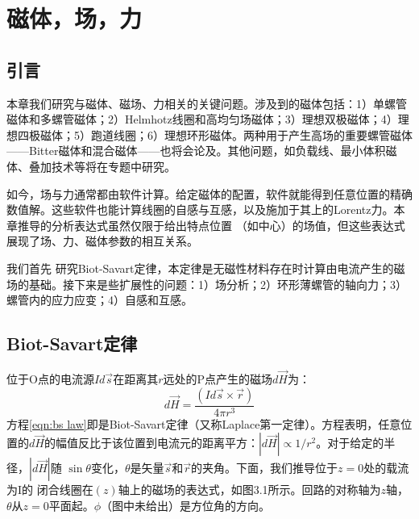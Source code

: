 \chapter{磁体，场，力}
\section{引言}
本章我们研究与磁体、磁场、力相关的关键问题。涉及到的磁体包括：1）单螺管磁体和多螺管磁体；2）Helmhotz线圈和高均匀场磁体；3）理想双极磁体；4）理想四极磁体；5）跑道线圈；6）理想环形磁体。两种用于产生高场的重要螺管磁体——Bitter磁体和混合磁体——也将会论及。其他问题，如负载线、最小体积磁体、叠加技术等将在专题中研究。

如今，场与力通常都由软件计算。给定磁体的配置，软件就能得到任意位置的精确数值解。这些软件也能计算线圈的自感与互感，以及施加于其上的Lorentz力。本章推导的分析表达式虽然仅限于给出特点位置
（如中心）的场值，但这些表达式展现了场、力、磁体参数的相互关系。

我们首先 研究Biot-Savart定律，本定律是无磁性材料存在时计算由电流产生的磁场的基础。接下来是些扩展性的问题：1）场分析；2）环形薄螺管的轴向力；3）螺管内的应力应变；4）自感和互感。

\section{Biot-Savart定律}
位于O点的电流源$Id\vec{s}$在距离其$r$远处的P点产生的磁场$d\vec{H}$为：
\begin{equation}\label{eqn:bs law}
  d\vec{H}=\frac{(Id\vec{s}\times \vec{r})}{4\pi r^3}
\end{equation}
方程\ref{eqn:bs law}即是Biot-Savart定律（又称Laplace第一定律）。方程表明，任意位置的$d\vec{H}$的幅值反比于该位置到电流元的距离平方：$|d\vec{H}|\propto 1/r^2$。对于给定的半径，$|d\vec{H}|$随
$\sin\theta$变化，$\theta$是矢量$\vec{s}$和$\vec{r}$的夹角。下面，我们推导位于$z=0$处的载流为I的
闭合线圈在$(z)$轴上的磁场的表达式，如图3.1所示。回路的对称轴为$z$轴，$\theta$从$z=0$平面起。$\phi$（图中未给出）是方位角的方向。

